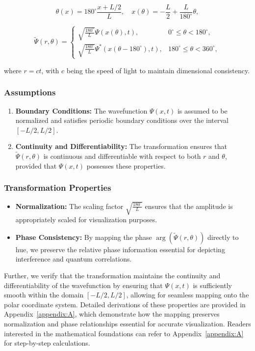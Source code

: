 \documentclass[12pt]{article}
\begin{document}
\[
\theta(x) = 180^\circ \frac{x + L/2}{L}, \quad x(\theta) = -\frac{L}{2} + \frac{L}{180^\circ}\theta,
\]

\[
\tilde{\Psi}(r, \theta) = 
\begin{cases}
\sqrt{\frac{180^\circ}{L}} \Psi(x(\theta), t), & 0^\circ \leq \theta < 180^\circ, \\
\sqrt{\frac{180^\circ}{L}} \Psi^*(x(\theta - 180^\circ), t), & 180^\circ \leq \theta < 360^\circ,
\end{cases}
\]

where \(r = ct\), with \(c\) being the speed of light to maintain dimensional consistency.

\subsubsection{Assumptions}
\begin{enumerate}
    \item \textbf{Boundary Conditions:} The wavefunction \(\Psi(x,t)\) is assumed to be normalized and satisfies periodic boundary conditions over the interval \([-L/2, L/2]\).
    \item \textbf{Continuity and Differentiability:} The transformation ensures that \(\tilde{\Psi}(r, \theta)\) is continuous and differentiable with respect to both \(r\) and \(\theta\), provided that \(\Psi(x,t)\) possesses these properties.
\end{enumerate}

\subsubsection{Transformation Properties}
\begin{itemize}
    \item \textbf{Normalization:} The scaling factor \(\sqrt{\frac{180^\circ}{L}}\) ensures that the amplitude is appropriately scaled for visualization purposes.
    \item \textbf{Phase Consistency:} By mapping the phase \(\arg(\tilde{\Psi}(r, \theta))\) directly to hue, we preserve the relative phase information essential for depicting interference and quantum correlations.
\end{itemize}

Further, we verify that the transformation maintains the continuity and differentiability of the wavefunction by ensuring that \(\Psi(x,t)\) is sufficiently smooth within the domain \([-L/2, L/2]\), allowing for seamless mapping onto the polar coordinate system. Detailed derivations of these properties are provided in Appendix~\ref{appendix:A}, which demonstrate how the mapping preserves normalization and phase relationships essential for accurate visualization. Readers interested in the mathematical foundations can refer to Appendix~\ref{appendix:A} for step-by-step calculations.
\end{document}
